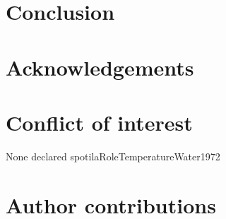 \section*{Conclusion}
\label{sec:conclu1}

\section*{Acknowledgements}
\label{sec:acknowl1}

\section*{Conflict of interest}
\label{sec:conflict1}

None declared
spotilaRoleTemperatureWater1972
\section*{Author contributions}
\label{sec:author1}

\cleardoublepage

\begin{otherlanguage}{english}

\end{otherlanguage}

